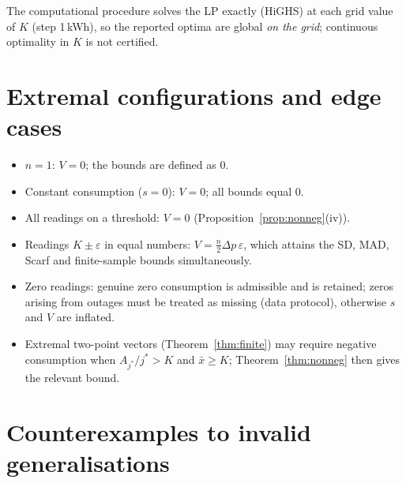 \documentclass[11pt,a4paper]{article}
\theoremstyle{definition}
\theoremstyle{plain}\newtheorem{sprop}{Proposition}[section]\newtheorem{slemma}[sprop]{Lemma}\newtheorem{scor}[sprop]{Corollary}
\theoremstyle{definition}
\theoremstyle{remark}
\newcommand{\xbar}{\bar{x}}
\numberwithin{equation}{section}
\begin{document}
\noindent The computational procedure solves the LP exactly (HiGHS) at each grid value of $K$ (step 1\,kWh), so the reported optima are global \emph{on the grid}; continuous optimality in $K$ is not certified.

\section{Extremal configurations and edge cases}\label{sec:S10}

\begin{itemize}
\item $n=1$: $V=0$; the bounds are defined as $0$.
\item Constant consumption ($s=0$): $V=0$; all bounds equal $0$.
\item All readings on a threshold: $V=0$ (Proposition~\ref{prop:nonneg}(iv)).
\item Readings $K\pm\varepsilon$ in equal numbers: $V=\frac n2\Delta p\,\varepsilon$, which attains the SD, MAD, Scarf and finite-sample bounds simultaneously.
\item Zero readings: genuine zero consumption is admissible and is retained; zeros arising from outages must be treated as missing (data protocol), otherwise $s$ and $V$ are inflated.
\item Extremal two-point vectors (Theorem~\ref{thm:finite}) may require negative consumption when $A_{j^\ast}/j^\ast>K$ and $\xbar\ge K$; Theorem~\ref{thm:nonneg} then gives the relevant bound.
\end{itemize}

\section{Counterexamples to invalid generalisations}\label{sec:S11}
\end{document}

